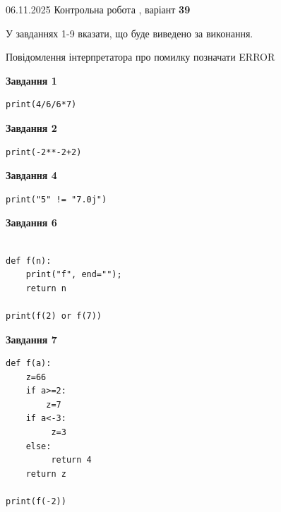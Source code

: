 \documentclass[12pt, ukrainian]{article}
\begin{document}
{\Large{06.11.2025 Контрольна робота , варіант  \No \textbf { 39 }\par}}
{
\begin {large}
У завданнях 1-9 вказати, що буде виведено за виконання.

Повідомлення інтерпретатора про помилку позначати ERROR

\begin{minipage}[t]{7.5cm}

\begin{center}
\textbf{Завдання 1}
\end{center}

\begin{verbatim}
print(4/6/6*7)
\end{verbatim}



\begin{center}
\textbf{Завдання 2}
\end{center}

\begin{verbatim}
print(-2**-2+2)
\end{verbatim}



\begin{center}
\textbf{Завдання 4}
\end{center}

\begin{verbatim}
print("5" != "7.0j")
\end{verbatim}



\begin{center}
\textbf{Завдання 6}
\end{center}

\begin{verbatim}

def f(n):
    print("f", end="");
    return n

print(f(2) or f(7))
\end{verbatim}



\begin{center}
\textbf{Завдання 7}
\end{center}

\begin{verbatim}
def f(a):
    z=66
    if a>=2: 
        z=7
    if a<-3:
         z=3
    else:
         return 4
    return z

print(f(-2))
\end{verbatim}


\end{minipage}
\end{large}}
\end{document}
